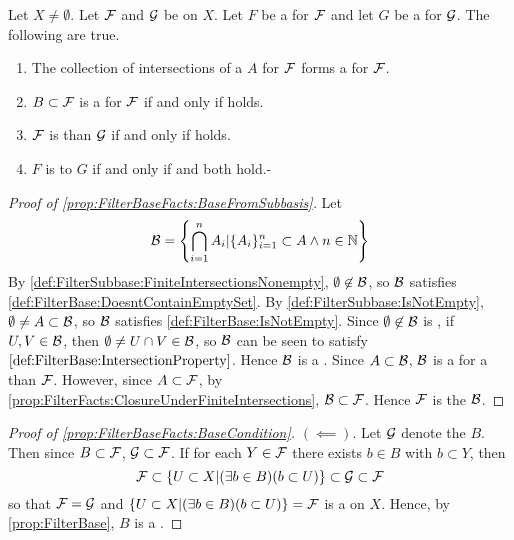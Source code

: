 \begin{prop}[FilterBaseFacts]
\label{prop:FilterBaseFacts}
   Let $X \neq \emptyset$. 
   Let $\mathcal{F}$ and $\mathcal{G}$ be \Filters on $X$. 
   Let $F$ be a \FilterBase for $\mathcal{F}$ and let 
   $G$ be a \FilterBase for $\mathcal{G}$. 
   The following are true. 
   \begin{enumerate}[label=(\roman*), ref={\ref{prop:FilterBaseFacts}.~\roman*}]
    \item \label{prop:FilterBaseFacts:BaseFromSubbasis}
        The collection of \Finite intersections of a 
        \FilterSubbasis $A$ for $\mathcal{F}$ 
        forms a \FilterBase for $\mathcal{F}$. 
    \item \label{prop:FilterBaseFacts:BaseCondition}
    $B \subset \mathcal{F}$ is a \FilterBase for $\mathcal{F}$ 
    if and only if  holds. 
    \item \label{prop:FilterBaseFacts:FinerCondition}
       $\mathcal{F}$ 
       is \FinerFilter than $\mathcal{G}$ if and only if  holds. 
    \item  \label{prop:FilterBaseFact:EquivalenceCondition} 
    $F$ is 
    \FilterBaseEquivalent to 
    $G$ if and only if  and  both hold.- 
   \end{enumerate}
   \begin{proof}[Proof of \ref{prop:FilterBaseFacts:BaseFromSubbasis}]
   Let 
   \begin{equation}
    \mathcal{B} = \left\{ \bigcap\limits_{i=1}^n A_i | \{A_i\}_{i=1}^n \subset A \wedge n \in \mathbb{N}\right\}
   \end{equation}
   By \ref{def:FilterSubbase:FiniteIntersectionsNonempty}, $\emptyset \not \in \mathcal{B}$, so $\mathcal{B}$ satisfies \ref{def:FilterBase:DoesntContainEmptySet}. 
   By \ref{def:FilterSubbase:IsNotEmpty}, $\emptyset \neq A \subset \mathcal{B}$, so $\mathcal{B}$ satisfies \ref{def:FilterBase:IsNotEmpty}. 
   Since $\emptyset \not \in \mathcal{B}$ is \ClosedUnderFiniteIntersections, if $U,V \in \mathcal{B}$, then $\emptyset \neq U \cap V \in \mathcal{B}$, so $\mathcal{B}$ can be seen to satisfy $\ref{def:FilterBase:IntersectionProperty}$. Hence $\mathcal{B}$ is a \FilterBase. 
   Since $A \subset \mathcal{B}$, $\mathcal{B}$ is a \FilterBase for a \FinerFilter than $\mathcal{F}$. 
   However, since $A \subset \mathcal{F}$, 
   by \ref{prop:FilterFacts:ClosureUnderFiniteIntersections}, $\mathcal{B} \subset \mathcal{F}$. 
   Hence $\mathcal{F}$ is the \Filter
   \FilterGeneratedBy $\mathcal{B}$. 
   \end{proof}
   \begin{proof}[Proof of \ref{prop:FilterBaseFacts:BaseCondition}]
    $(\impliedby)$. Let $\mathcal{G}$ denote the \Filter \FilterGeneratedBy $B$. 
    Then since $B \subset \mathcal{F}$, $\mathcal{G} \subset \mathcal{F}$. 
    If for each $Y \in \mathcal{F}$ there exists $b \in B$ with $b \subset Y$, then 
    \begin{equation}
    \mathcal{F} \subset \{U \subset X | (\exists b \in B) (b \subset U) \} \subset \mathcal{G} \subset \mathcal{F}
    \end{equation}
    so that $\mathcal{F} = \mathcal{G}$ and 
    $\{U \subset X | (\exists b \in B) (b \subset U)\}= \mathcal{F}$ is a \Filter on $X$. 
    Hence, by  \ref{prop:FilterBase}, $B$ is a \Filter. 


\end{proof}
\end{prop}
